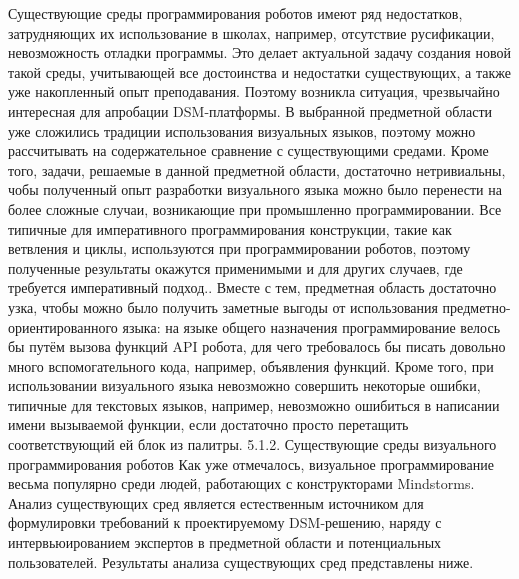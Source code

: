 	Существующие среды программирования роботов имеют ряд недостатков, затрудняющих их использование в школах, например, отсутствие русификации, невозможность отладки программы. Это делает актуальной задачу создания новой такой среды, учитывающей все достоинства и недостатки существующих, а также уже накопленный опыт преподавания. Поэтому возникла ситуация, чрезвычайно интересная для апробации DSM-платформы. В выбранной предметной области уже сложились традиции использования визуальных языков, поэтому можно рассчитывать на содержательное сравнение с существующими средами. Кроме того, задачи, решаемые в данной предметной области, достаточно нетривиальны, чобы полученный опыт разработки визуального языка можно было перенести на более сложные случаи, возникающие при промышленно программировании. Все типичные для императивного программирования конструкции, такие как ветвления и циклы, используются при программировании роботов, поэтому полученные результаты окажутся применимыми и для других случаев, где требуется императивный подход.. Вместе с тем, предметная область достаточно узка, чтобы можно было получить заметные выгоды от использования предметно-ориентированного языка: на языке общего назначения программирование велось бы путём вызова функций API робота, для чего требовалось бы писать довольно много вспомогательного кода, например, объявления функций. Кроме того, при использовании визуального языка невозможно совершить некоторые ошибки, типичные для текстовых языков, например, невозможно ошибиться в написании имени вызываемой функции, если достаточно просто перетащить соответствующий ей блок из палитры.
5.1.2. Существующие среды визуального программирования роботов
Как уже отмечалось, визуальное программирование весьма популярно среди людей, работающих с конструкторами Mindstorms. Анализ существующих сред является естественным источником для формулировки требований к проектируемому DSM-решению, наряду с интервьюированием экспертов в предметной области и потенциальных пользователей. Результаты анализа существующих сред представлены ниже.
